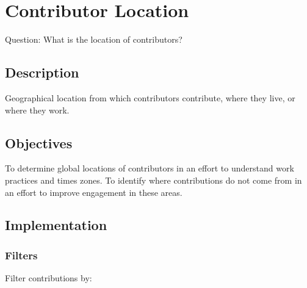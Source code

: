 \documentclass[
  12pt,
]{article}
\begin{document}
\hypertarget{contributor-location}{%
\section{Contributor Location}\label{contributor-location}}

Question: What is the location of contributors?

\hypertarget{description-7}{%
\subsection{Description}\label{description-7}}

Geographical location from which contributors contribute, where they
live, or where they work.

\hypertarget{objectives-7}{%
\subsection{Objectives}\label{objectives-7}}

To determine global locations of contributors in an effort to understand
work practices and times zones. To identify where contributions do not
come from in an effort to improve engagement in these areas.

\hypertarget{implementation-7}{%
\subsection{Implementation}\label{implementation-7}}

\hypertarget{filters-5}{%
\subsubsection{Filters}\label{filters-5}}

Filter contributions by:
\end{document}
